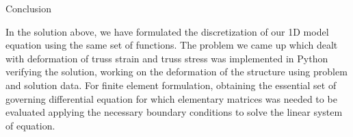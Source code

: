 \documentclass[a4paper,15pt]{article}
\begin{document}
	\begin{center}
		Conclusion
	\end{center}
     In the solution above, we have formulated the discretization of our 1D model equation using the same set of functions. The problem we came up which dealt with deformation of truss strain and truss stress was implemented in Python verifying the solution, working on the deformation of the structure using problem and solution data. For finite element formulation, obtaining the essential set of governing differential equation for which elementary matrices was needed to be evaluated applying the necessary boundary conditions to solve the linear system of equation. 
  
\end{document}
